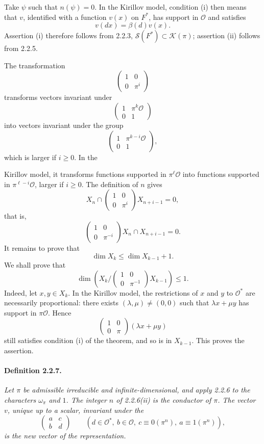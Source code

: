 \documentclass[10pt,a4paper]{article}
\providecommand{\OO}{\mathcal O}
\providecommand{\calK}{\mathcal K}
\begin{document}
Take \(\psi\) such that \(n(\psi)=0\). In the Kirillov model, condition (i) then means that \(v\), identified with a function \(v(x)\) on \(F^*\), has support in \(\OO\) and satisfies
\[
v(dx)=\beta(d)v(x).
\]
Assertion (i) therefore follows from 2.2.3, \(\mathcal S(F^*)\subset\calK(\pi)\); assertion (ii) follows from 2.2.5.

The transformation
\[
\begin{pmatrix}1&0\\0&\pi^{i}\end{pmatrix}
\]
transforms vectors invariant under
\[
\begin{pmatrix}1&\pi^k\OO\\0&1\end{pmatrix}
\]
into vectors invariant under the group
\[
\begin{pmatrix}1&\pi^{k-i}\OO\\0&1\end{pmatrix},
\]
which is larger if \(i\ge0\). In the

\clearpage
{}
\hypertarget{authority-28}{}
Kirillov model, it transforms functions supported in \(\pi^\ell\OO\) into functions supported in \(\pi^{\ell-i}\OO\), larger if \(i\ge0\). The definition of \(n\) gives
\[
X_n\cap
\begin{pmatrix}1&0\\0&\pi^i\end{pmatrix}X_{n+i-1}=0,
\]
that is,
\[
\begin{pmatrix}1&0\\0&\pi^{-i}\end{pmatrix}X_n\cap X_{n+i-1}=0.
\]
It remains to prove that
\[
\dim X_k\le \dim X_{k-1}+1.
\]
We shall prove that
\[
\dim\left(X_k\Big/
\begin{pmatrix}1&0\\0&\pi^{-1}\end{pmatrix}X_{k-1}\right)\le1.
\]
Indeed, let \(x,y\in X_k\). In the Kirillov model, the restrictions of \(x\) and \(y\) to \(\OO^*\) are necessarily proportional: there exists \((\lambda,\mu)\ne(0,0)\) such that \(\lambda x+\mu y\) has support in \(\pi\OO\). Hence
\[
\begin{pmatrix}1&0\\0&\pi\end{pmatrix}(\lambda x+\mu y)
\]
still satisfies condition (i) of the theorem, and so is in \(X_{k-1}\). This proves the assertion.

\paragraph{Definition 2.2.7.}{\itshape  Let \(\pi\) be admissible irreducible and infinite-dimensional, and apply 2.2.6 to the characters \(\omega_\pi\) and \(1\). The integer \(n\) of 2.2.6(ii) is the conductor of \(\pi\). The vector \(v\), unique up to a scalar, invariant under the
\[
\begin{pmatrix}a&c\\b&d\end{pmatrix}
\qquad
(d\in\OO^*,\ b\in\OO,\ c\equiv0(\pi^n),\ a\equiv1(\pi^n)),
\]
is the new vector of the representation.\par}
\end{document}
